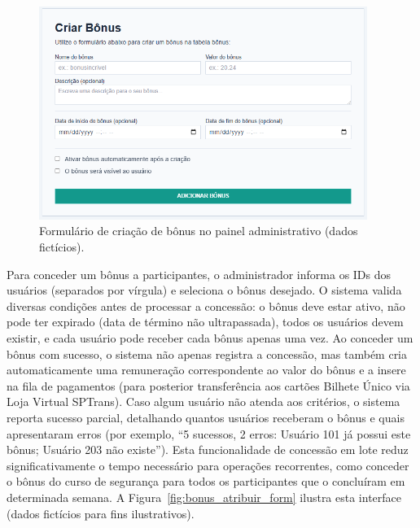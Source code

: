  \begin{figure}[H]
   \centering
   \includegraphics[width=0.95\textwidth]{figuras/criar_bonus.PNG}
   \caption{Formulário de criação de bônus no painel administrativo (dados fictícios).}
   \label{fig:bonus_criar_form}
 \end{figure}

Para conceder um bônus a participantes, o
administrador informa os IDs dos usuários (separados por vírgula) e seleciona o
bônus desejado. O sistema valida diversas condições antes de processar a
concessão: o bônus deve estar ativo, não pode ter expirado (data de término não
ultrapassada), todos os usuários devem existir, e cada usuário pode receber cada
bônus apenas uma vez. Ao conceder um bônus com sucesso, o sistema não apenas registra a concessão, mas
também cria automaticamente uma remuneração correspondente ao valor do bônus e a
insere na fila de pagamentos (para posterior transferência aos cartões Bilhete
Único via Loja Virtual SPTrans). Caso algum usuário não atenda aos critérios, o
sistema reporta sucesso parcial, detalhando quantos usuários receberam o bônus e
quais apresentaram erros (por exemplo, ``5 sucessos, 2 erros: Usuário 101 já
possui este bônus; Usuário 203 não existe''). Esta funcionalidade de concessão em
lote reduz significativamente o tempo necessário para operações recorrentes, como
conceder o bônus do curso de segurança para todos os participantes que o
concluíram em determinada semana. A Figura~\ref{fig:bonus_atribuir_form} ilustra esta interface (dados fictícios para fins ilustrativos).


